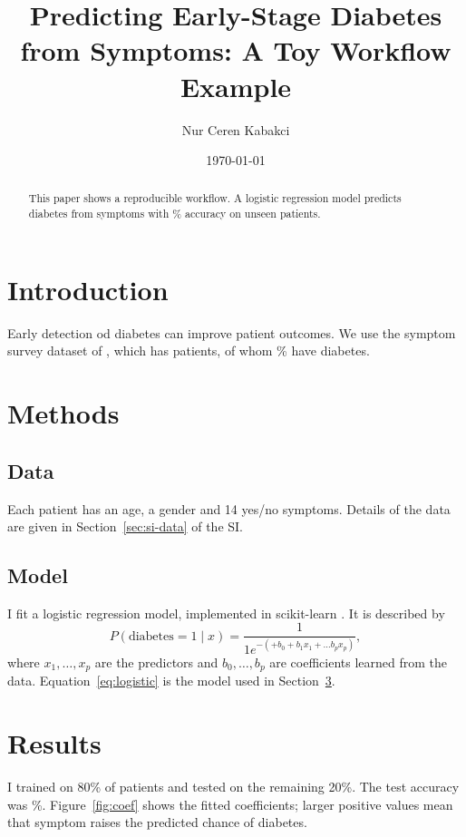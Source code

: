 \documentclass[11pt]{article}
\title{Predicting Early-Stage Diabetes from Symptoms: A Toy Workflow Example}
\author{Nur Ceren Kabakci}
\date{\today}
\begin{document}
\maketitle

\begin{abstract}
    This paper shows a reproducible workflow. A logistic regression model predicts diabetes from symptoms with \testaccuracy\% accuracy on unseen patients.

\end{abstract}

\section{Introduction}
\label{sec:intro}
Early detection od diabetes can improve patient outcomes. We use the symptom survey dataset of \cite{islam2020}, which has
\npatients{} patients, of whom \percentpositive\% have diabetes.

\section{Methods}
\label{sec:methods}

\subsection{Data}
Each patient has an age, a gender and 14 yes/no symptoms. Details of the data are given in Section~\ref{sec:si-data} of the SI.

\subsection{Model}
I fit a logistic regression model, implemented in scikit-learn \cite{pedregosa2011}. It is described by
\begin{equation}
    P(\text{diabetes}=1 \mid x) = \frac{1}{1 e^{-(+ b_0 + b_1 x_1 + \dots b_p x_p)}},
    \label{eq:logistic}
\end{equation}
where $x_1,\dots,x_p$ are the predictors and $b_0,\dots,b_p$ are coefficients
learned from the data. Equation~\ref{eq:logistic} is the model used in
Section~\ref{sec:results}.

\section{Results}
\label{sec:results}
I trained on 80\% of patients and tested on the remaining 20\%. The test accuracy was \testaccuracy\%.
Figure~\ref{fig:coef} shows the fitted coefficients; larger positive values mean that symptom raises the predicted chance of diabetes.
\end{document}
